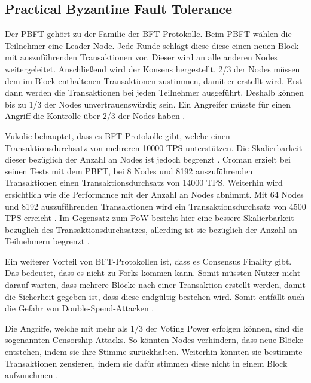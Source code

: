\subsection{Practical Byzantine Fault Tolerance}
Der PBFT gehört zu der Familie der BFT-Protokolle. Beim PBFT wählen die Teilnehmer eine Leader-Node. Jede Runde schlägt diese diese einen neuen Block mit auszuführenden Transaktionen vor. Dieser wird an alle anderen Nodes weitergeleitet. Anschließend wird der Konsens hergestellt. 2/3 der Nodes müssen dem im Block enthaltenen Transaktionen zustimmen, damit er erstellt wird. Erst dann werden die Transaktionen bei jeden Teilnehmer ausgeführt. Deshalb können bis zu 1/3 der Nodes unvertrauenswürdig sein. Ein Angreifer müsste für einen Angriff die Kontrolle über 2/3 der Nodes haben \cite{SukhwaniPerformanceModelingPBFT2017a}\cite{ZhengBlockchainChallengesOpportunities2017}. 

Vukolic behauptet, dass es BFT-Protokolle gibt, welche einen Transaktionsdurchsatz von mehreren 10000 TPS unterstützen. Die Skalierbarkeit dieser bezüglich der Anzahl an Nodes ist jedoch begrenzt \cite{Vukolicquestscalableblockchain2015}. Croman erzielt bei seinen Tests mit dem PBFT, bei 8 Nodes und 8192 auszuführenden Transaktionen einen Transaktionsdurchsatz von 14000 TPS. Weiterhin wird ersichtlich wie die Performance mit der Anzahl an Nodes abnimmt. Mit 64 Nodes und 8192 auszuführenden Transaktionen wird ein Transaktionsdurchsatz von 4500 TPS erreicht \cite{CromanScalingDecentralizedBlockchains2016}. Im Gegensatz zum PoW besteht hier eine bessere Skalierbarkeit bezüglich des Transaktionsdurchsatzes, allerding ist sie bezüglich der Anzahl an Teilnehmern begrenzt \cite{Vukolicquestscalableblockchain2015}.

Ein weiterer Vorteil von BFT-Protokollen ist, dass es Consensus Finality gibt. Das bedeutet, dass es nicht zu Forks kommen kann. Somit müssten Nutzer nicht darauf warten, dass mehrere Blöcke nach einer Transaktion erstellt werden, damit die Sicherheit gegeben ist, dass diese endgültig bestehen wird. Somit entfällt auch die Gefahr von Double-Spend-Attacken \cite{Vukolicquestscalableblockchain2015}.

Die Angriffe, welche mit mehr als 1/3 der Voting Power erfolgen können, sind die sogenannten Censorship Attacks. So könnten Nodes verhindern, dass neue Blöcke entstehen, indem sie ihre Stimme zurückhalten. Weiterhin könnten sie bestimmte Transaktionen zensieren, indem sie dafür stimmen diese nicht in einem Block aufzunehmen \cite{tendermintTendermintCore2018}.

